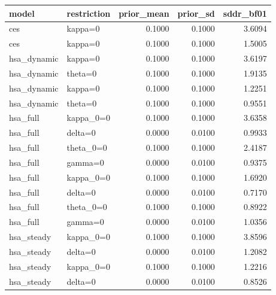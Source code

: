 \begin{tabular}{llrrr}
\toprule
model & restriction & prior\_mean & prior\_sd & sddr\_bf01 \\
\midrule
ces & kappa=0 & 0.1000 & 0.1000 & 3.6094 \\
ces & kappa=0 & 0.1000 & 0.1000 & 1.5005 \\
hsa\_dynamic & kappa=0 & 0.1000 & 0.1000 & 3.6197 \\
hsa\_dynamic & theta=0 & 0.1000 & 0.1000 & 1.9135 \\
hsa\_dynamic & kappa=0 & 0.1000 & 0.1000 & 1.2251 \\
hsa\_dynamic & theta=0 & 0.1000 & 0.1000 & 0.9551 \\
hsa\_full & kappa\_0=0 & 0.1000 & 0.1000 & 3.6358 \\
hsa\_full & delta=0 & 0.0000 & 0.0100 & 0.9933 \\
hsa\_full & theta\_0=0 & 0.1000 & 0.1000 & 2.4187 \\
hsa\_full & gamma=0 & 0.0000 & 0.0100 & 0.9375 \\
hsa\_full & kappa\_0=0 & 0.1000 & 0.1000 & 1.6920 \\
hsa\_full & delta=0 & 0.0000 & 0.0100 & 0.7170 \\
hsa\_full & theta\_0=0 & 0.1000 & 0.1000 & 0.8922 \\
hsa\_full & gamma=0 & 0.0000 & 0.0100 & 1.0356 \\
hsa\_steady & kappa\_0=0 & 0.1000 & 0.1000 & 3.8596 \\
hsa\_steady & delta=0 & 0.0000 & 0.0100 & 1.2082 \\
hsa\_steady & kappa\_0=0 & 0.1000 & 0.1000 & 1.2216 \\
hsa\_steady & delta=0 & 0.0000 & 0.0100 & 0.8526 \\
\bottomrule
\end{tabular}
